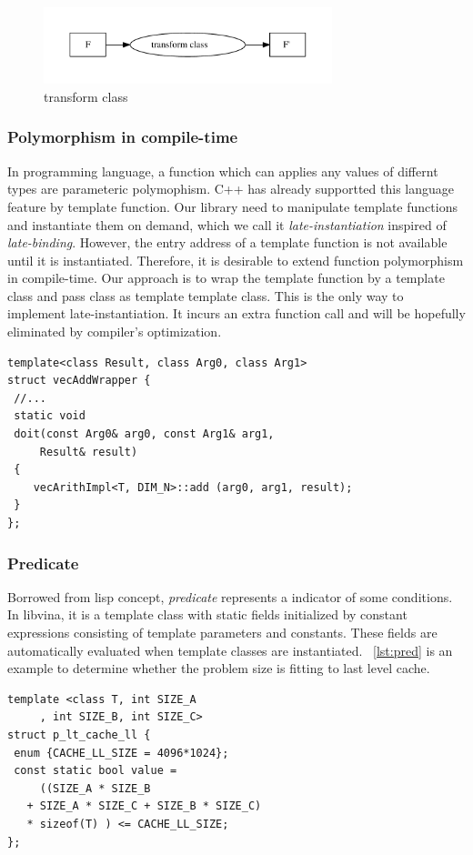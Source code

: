 \documentclass[10pt, conference, compsocconf]{IEEEtran}
\begin{document}
\begin{figure}
\centering
\includegraphics[width=3.3in]{map-class}
\caption{transform class}
\label{fig:tfcls}
\end{figure}

\subsubsection{Polymorphism in compile-time}
In programming language, a function which can applies any values of differnt types are parameteric polymophism. C++ has already supportted this language feature by template function. Our library need to manipulate template functions and instantiate them on demand, which we call it \emph{late-instantiation} inspired of \emph{late-binding}. However, the entry address of a template function is not available until it is instantiated. Therefore, it is desirable to extend function polymorphism in compile-time. Our approach is to wrap the template function by a template class and pass class as template template class. This is the only way to implement late-instantiation. It incurs an extra function call and will be hopefully eliminated by compiler's optimization.

\begin{verbatim}
template<class Result, class Arg0, class Arg1>
struct vecAddWrapper {
 //...
 static void 
 doit(const Arg0& arg0, const Arg1& arg1, 
     Result& result)
 {
    vecArithImpl<T, DIM_N>::add (arg0, arg1, result);
 }
};
\end{verbatim}

\subsubsection{Predicate}
Borrowed from lisp concept, \emph{predicate} represents a indicator of some conditions. In libvina, it is a template class with static fields initialized by constant expressions consisting of template parameters and constants. These fields are automatically evaluated when template classes are instantiated. ~\ref{lst:pred} is an example to determine whether the problem size is fitting to last level cache.

\makebox[3.1\width]{\hrulefill}
\begin{verbatim}
template <class T, int SIZE_A
     , int SIZE_B, int SIZE_C>
struct p_lt_cache_ll {
 enum {CACHE_LL_SIZE = 4096*1024};
 const static bool value = 
     ((SIZE_A * SIZE_B 
   + SIZE_A * SIZE_C + SIZE_B * SIZE_C) 
   * sizeof(T) ) <= CACHE_LL_SIZE;
};
\end{verbatim}
\end{document}
